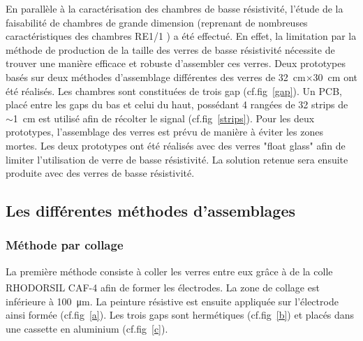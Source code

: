 En parallèle à la caractérisation des chambres de basse résistivité, l'étude de la faisabilité de chambres de grande dimension (reprenant de nombreuses caractéristiques des chambres RE1/1 \cite{gapss}) a été effectué. En effet, la limitation par la méthode de production de la taille des verres de basse résistivité nécessite de trouver une manière efficace et robuste d'assembler ces verres.  Deux prototypes basés sur deux méthodes d'assemblage différentes des verres de \SI{32}{\centi\meter}$\times$\SI{30}{\centi\meter} ont été réalisés. Les chambres sont constituées de trois gap (cf.fig~\ref{gap}). Un PCB, placé entre les gaps du bas et celui du haut, possédant \num{4} rangées de \num{32} strips de $\sim$\SI{1}{\centi\meter} est utilisé afin de récolter le signal (cf.fig~\ref{strips}). Pour les deux prototypes, l'assemblage des verres est prévu de manière à éviter les zones mortes. Les deux prototypes ont été réalisés avec des verres "float glass" afin de limiter l'utilisation de verre de basse résistivité. La solution retenue sera ensuite produite avec des verres de basse résistivité.

\subsection{Les différentes méthodes d'assemblages} 
\subsubsection{Méthode par collage}
La première méthode consiste à coller les verres entre eux grâce à de la colle RHODORSIL\textsuperscript{\textregistered}
 CAF-4 afin de former les électrodes. La zone de collage est inférieure à \SI{100}{\micro\meter}. La peinture résistive est ensuite appliquée sur l'électrode ainsi formée (cf.fig~\ref{a}). Les trois gaps sont hermétiques (cf.fig~\ref{b}) et placés dans une cassette en aluminium (cf.fig~\ref{c}).
 
